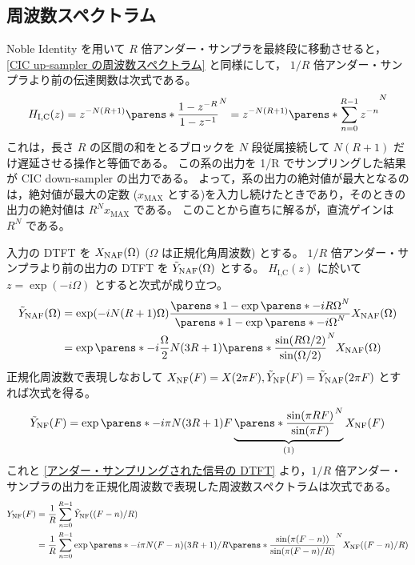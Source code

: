     \subsection{周波数スペクトラム}
        Noble Identity を用いて $R$ 倍アンダー・サンプラを最終段に移動させると，\ref{CIC up-sampler の周波数スペクトラム} と同様にして， $1/R$ 倍アンダー・サンプラより前の伝達関数は次式である。
        \[ H_\text{I,C}(z) = z^{-N(R+1)}\parens*{\frac{1-z^{-R}}{1-z^{-1}}}^N = z^{-N(R+1)}\parens*{\sum_{n=0}^{R-1}z^{-n}}^N \]
        これは，長さ $R$ の区間の和をとるブロックを $N$ 段従属接続して $N(R+1)$ だけ遅延させる操作と等価である。
        この系の出力を 1/R でサンプリングした結果が CIC down-sampler の出力である。
        よって，系の出力の絶対値が最大となるのは，絶対値が最大の定数 ($x_\text{MAX}$ とする)を入力し続けたときであり，そのときの出力の絶対値は $R^N x_\text{MAX}$ である。
        このことから直ちに解るが，直流ゲインは $R^N$ である。
        \par
        入力の DTFT を $X_\text{NAF}(\Omega)$ ($\Omega$ は正規化角周波数) とする。
        $1/R$ 倍アンダー・サンプラより前の出力の DTFT を $\tilde{Y}_\text{NAF}(\Omega)$ とする。
        $H_\text{I,C}(z)$ に於いて $z = \exp(-i\Omega)$ とすると次式が成り立つ。
        \begin{align*}
            \tYNAF(\Omega) &= \exp(-iN(R+1)\Omega)\frac{\parens*{1-\exp\parens*{-iR\Omega}}^N}{\parens*{1-\exp\parens*{-i\Omega}}^N}\XNAF(\Omega) \\
            &= \exp\parens*{-i\frac{\Omega}{2}N(3R+1)}\parens*{\frac{\sin(R\Omega/2)}{\sin(\Omega/2)}}^N \XNAF(\Omega)
        \end{align*}
        正規化周波数で表現しなおして $X_\text{NF}(F) = X(2\pi F), \tilde{Y}_\text{NF}(F) = \tilde{Y}_\text{NAF}(2\pi F)$ とすれば次式を得る。
        \begin{equation}
            \label{equation:CIC down-sampler のアンダー・サンプリング前の周波数特性}
            \tYNF(F) = \exp\parens*{-i\pi N(3R+1)F}\underbrace{\parens*{\frac{\sin(\pi R F)}{\sin(\pi F)}}^N}_{(1)} \XNF(F)
        \end{equation}
        これと \ref{アンダー・サンプリングされた信号の DTFT} より，$1/R$ 倍アンダー・サンプラの出力を正規化周波数で表現した周波数スペクトラムは次式である。
        \begin{align}
            \YNF(F) &= \frac{1}{R}\sum_{n=0}^{R-1} \tYNF((F-n)/R) \nonumber \\
            &= \frac{1}{R}\sum_{n=0}^{R-1} \exp\parens*{-i\pi N(F-n)(3R+1)/R}\parens*{\frac{\sin(\pi(F-n))}{\sin(\pi(F-n)/R)}}^N \XNF((F-n)/R) \label{equation:CIC down-sampler の周波数スペクトラム}
        \end{align}

